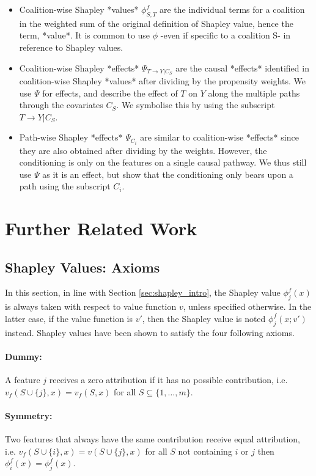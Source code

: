 \documentclass{article}
\theoremstyle{plain}
\theoremstyle{definition}
\theoremstyle{remark}
\newcommand{\effect}{\Psi}
\theoremstyle{mystyle}
\begin{document}
\begin{itemize}
    \item Coalition-wise Shapley *values*  $\phi^{f}_{S,T}$ are the individual terms for a coalition in the weighted sum of the original definition of Shapley value, hence the term, *value*. It is common to use $\phi$ -even if specific to a coalition S- in reference to Shapley values. 
    \item Coalition-wise Shapley *effects* $\effect_{T \rightarrow Y | C_{S}}$ are the causal *effects* identified in  coalition-wise Shapley *values* after dividing by the propensity weights. We use $\effect$ for effects, and describe the effect of $T$ on $Y$ along the multiple paths through the covariates $C_S$. We symbolise this by using the subscript $T \rightarrow Y | C_{S}$.
    \item Path-wise Shapley *effects* $\effect_{C_i}$ are similar to coalition-wise *effects* since they are also obtained after dividing by the weights. However, the conditioning is only on the features on a single causal pathway. We thus still use $\effect$ as it is an effect, but show that the conditioning only bears upon a path using the subscript $C_i$.
\end{itemize}

\section{Further Related Work} \label{sec:further}

\subsection{Shapley Values: Axioms} \label{subsec:shap_axioms}

In this section, in line with Section \ref{sec:shapley_intro}, the Shapley value $\phi^f_{j}(x)$ is always taken with respect to value function $v$, unless specified otherwise. In the latter case, if the value function is $v'$, then the Shapley value is noted $\phi^f_{j}(x; v')$ instead. Shapley values have been shown to satisfy the four following axioms. 

\paragraph{Dummy:}{A feature $j$ receives a zero attribution if it has no possible contribution, i.e. $v_f(S \cup \{j\},x)=v_f(S,x)$ for all $S \subseteq\{1, \ldots, m\}$.}
\paragraph{Symmetry:}{Two features that always have the same contribution receive equal attribution, i.e. $v_f(S \cup \{i\},x)=v(S \cup \{j\},x)$ for all $S$ not containing $i$ or $j$ then $\phi^f_{i}(x)=\phi^f_{j}(x)$.}
\end{document}
